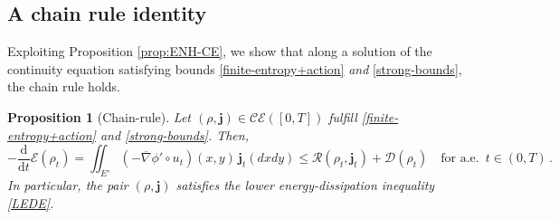\documentclass[11pt,reqno]{amsart}
\numberwithin{equation}{section}
\newcommand{\CE}[2]{\calC \calE([#1,#2])}
\newcommand{\calC}{\mathcal{C}}
\newcommand{\calE}{\mathcal{E}}
\newcommand{\dnabla}{\overline\nabla}
\newcommand{\dd}{\mathrm{d}}
\newtheorem{proposition}[theorem]{Proposition}
\theoremstyle{definition}
\newcommand{\foraa}{\text{for a.e.\ }}
\def\dd{\mathrm{d}}
\def\calS{\mathscr E}
\newcommand{\scrR}{\mathscr{R}}
\newcommand{\scrD}{\mathscr{D}}
\newcommand{\jj}{{\boldsymbol{j}}}
\newcommand{\Ed}{{E'}}
\newcommand{\RBS}{\color{black}} %
\newcommand{\EEE}{\color{black}}
\numberwithin{equation}{section}
\begin{document}
           





\RBS 
\subsection{A chain rule identity}
Exploiting Proposition \ref{prop:ENH-CE}, we show that along a solution of the continuity equation satisfying bounds \eqref{finite-entropy+action} \emph{and} \eqref{strong-bounds}, the chain rule holds. 
\begin{proposition}[Chain-rule]
\label{prop:CR}
 Let $(\rho,\jj)\in\CE 0T$ fulfill \eqref{finite-entropy+action}   and \eqref{strong-bounds}. Then,
 \begin{equation}
 \label{chain-rule}
  -  \frac{\dd}{\dd t} \calS(\rho_t) =
     \iint_{\Ed} ({-}\dnabla \phi'\circ u_t)(x,y)\, \jj_t(dxdy)
     \leq  \scrR(\rho_t,\jj_t) + \scrD(\rho_t) \quad \foraa\, t \in (0,T)\,.
 \end{equation} \EEE
 In particular, the pair $(\rho,\jj)$ satisfies the lower energy-dissipation inequality \eqref{LEDE}. 
\end{proposition}
\end{document}
